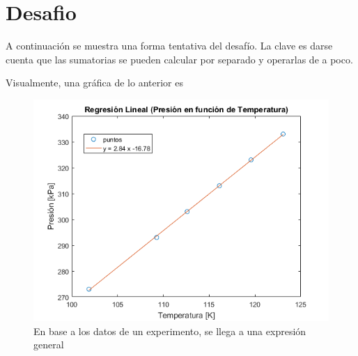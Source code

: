 \section{Desafio}
  
A continuación se muestra una forma tentativa del desafío. La clave es darse cuenta que las sumatorias se pueden calcular por separado y operarlas de a poco.

  

Visualmente, una gráfica de lo anterior es
\begin{figure}[h]
    \centering
    \includegraphics[scale=0.55]{Imagenes/regresion.png}
    \caption{En base a los datos de un experimento, se llega a una expresión general}
\end{figure}